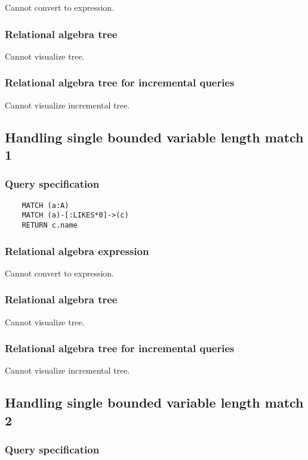 	Cannot convert to expression.

	\subsubsection*{Relational algebra tree}

	Cannot visualize tree.

	\subsubsection*{Relational algebra tree for incremental queries}

	Cannot visualize incremental tree.
	\subsection{Handling single bounded variable length match 1}

	\subsubsection*{Query specification}

	\begin{lstlisting}
	MATCH (a:A)
	MATCH (a)-[:LIKES*0]->(c)
	RETURN c.name
	\end{lstlisting}


	\subsubsection*{Relational algebra expression}

	Cannot convert to expression.

	\subsubsection*{Relational algebra tree}

	Cannot visualize tree.

	\subsubsection*{Relational algebra tree for incremental queries}

	Cannot visualize incremental tree.
	\subsection{Handling single bounded variable length match 2}

	\subsubsection*{Query specification}

